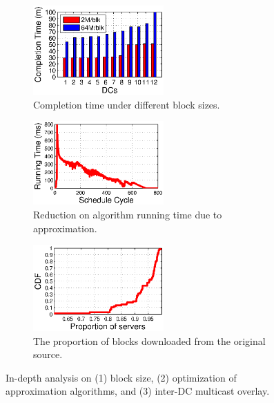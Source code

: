 \begin{figure}[t]
        \centering
        \begin{subfigure}[b]{0.3\textwidth}
                \centering
                \includegraphics[width=50mm]{images/blkSize.eps} %
                \caption{Completion time under different block sizes.}
                \label{fig:analysis:blksize}
        \end{subfigure}
        \begin{subfigure}[b]{0.3\textwidth}
                \centering
                \includegraphics[width=50mm]{images/cycle.eps} %
                \caption{Reduction on algorithm running time due to approximation.}
                \label{fig:analysis:time}
        \end{subfigure}
        \begin{subfigure}[b]{0.3\textwidth}
                \centering
                \includegraphics[width=50mm]{images/overlay.eps}
                \caption{The proportion of blocks downloaded from the original source.}
                \label{fig:analysis:overlay}
        \end{subfigure}
        \caption{In-depth analysis on (1) block size, (2) optimization of approximation algorithms, and (3) inter-DC multicast overlay.}
        \label{fig:analysis}
\vspace{-0.4cm}
\end{figure}


